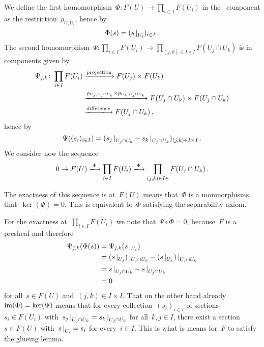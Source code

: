 \section{}

We define the first homomorphism~$\Phi \colon F(U) \to \prod_{i \in I} F(U_i)$ in the~ component as the restriction~$\rho_{U, U_i}$, hence by
\[
    \Phi( s )
  = ( \restrict{s}{U_i} )_{i \in I} \,.
\]
The second homomorphism~$\Psi \colon \prod_{i \in I} F(U_i) \to \prod_{(j,k) \in I \times I} F(U_j \cap U_k)$ is in components given by
\begin{align*}
  \Psi_{j,k}
  \colon
  \prod_{i \in I} F(U_i)
  &\xlongto{\text{projection}}
  F(U_j) \times F(U_k)  \\
  &\xlongto{\rho_{U_j, U_j \cap U_k} \times \rho_{U_k, U_j \cap U_k}}
  F(U_j \cap U_k) \times F(U_j \cap U_k)  \\
  &\xlongto{\text{difference}}
  F(U_j \cap U_k) \,,
\end{align*}
hence by
\[
    \Psi( (s_i)_{i \in I} )
  = ( \restrict{s_j}{U_j \cap U_k} - \restrict{s_k}{U_j \cap U_k} )_{(j,k) \in I \times I} \,.
\]
We consider now the sequence
\begin{equation}
  \label{considered sequence}
  0
  \to
  F(U)
  \xlongto{\Phi}
  \prod_{i \in I} F(U_i)
  \xlongto{\Psi}
  \prod_{(j,k) \in I \in } F(U_j \cap U_k) \,.
\end{equation}

The exactness of this sequence is at~$F(U)$ means that~$\Phi$ is a monmorphisms, that~$\ker(\Phi) = 0$.
This is equivalent to~$\Phi$ satisfying the separability axiom.

For the exactness at~$\prod_{i \in I} F(U_i)$ we note that~$\Psi \circ \Phi = 0$, because~$F$ is a presheaf and therefore
\begin{align*}
      \Psi_{j,k}( \Phi(s) )
  &=  \Psi_{j,k}( \restrict{s}{U_i} ) \\
  &=  \restrict{(\restrict{s}{U_j})}{U_j \cap U_k} - \restrict{(\restrict{s}{U_k})}{U_j \cap U_k} \\
  &=  \restrict{s}{U_j \cap U_k} - \restrict{s}{U_j \cap U_k} \\
  &=  0
\end{align*}
for all~$s \in F(U)$ and~$(j,k) \in I \times I$.
That on the other hand already~$\operatorname{im}(\Phi) = \ker(\Psi)$ means that for every collection~$(s_i)_{i \in I}$ of sections~$s_i \in F(U_i)$ with~$\restrict{s_j}{U_j \cap U_k} = \restrict{s_k}{U_j \cap U_k}$ for all~$k,j \in I$, there exist a section~$s \in F(U)$ with~$\restrict{s}{U_i} = s_i$ for every~$i \in I$.
This is what is means for~$F$ to satisfy the glueing lemma.

